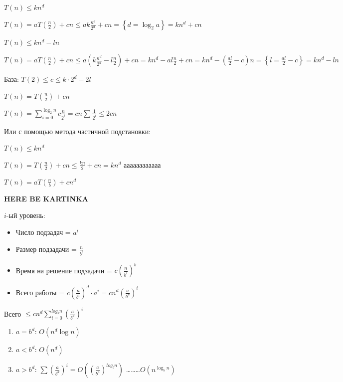 $T(n) \leqslant kn^d$

$T(n) = aT(\frac n2) + cn \leqslant ak \frac{n^d}{2^d}+cn = \left\{ d = \log_2a \right\} = kn^d + cn$

$T(n) \leqslant kn^d - ln$

$T(n) = aT(\frac n2) + cn \leqslant a\left(k \frac{n^d}{2^d}-l\frac n2\right)+cn = kn^d - al\frac n2 + cn = kn^d - \left( \frac{al}{2} - c \right)n = \left\{ l = \frac{al}{2} - c \right\} = kn^d - ln$

База: $T(2) \leqslant c \leqslant k\cdot 2^d - 2l$

$T(n) = T\left( \frac n2 \right) + cn$

$T(n) = \sum\limits_{i=0}^{\log_2n}c\frac{n}{2^i} = cn \sum\frac{1}{2^i} \leqslant 2cn$

Или с помощью метода частичной подстановки:

$T(n) \leqslant kn^d$

$T(n) = T\left( \frac n2 \right) + cn \leqslant \frac{kn}{2} + cn = kn^d$ аааааааааааа

\vspace{1cm}
$T(n) = aT\left( \frac nb \right) + cn^d$

\vspace{1.5cm}
\textbf{HERE BE KARTINKA}
\vspace{1.5cm}

$i$-ый уровень:
\begin{itemize}
    \item Число подзадач = $a^i$
    \item Размер подзадачи = $\frac{n}{b^i}$
    \item Время на решение подзадачи = $c\left( \frac{n}{b^i} \right)^b$
    \item Всего работы = $c\left(\frac{n}{b^i}\right)^d\cdot a^i = cn^d\left(\frac{a}{b^d}\right)^i$
\end{itemize}

Всего $\leqslant cn^d \sum\limits_{i=0}^{log_bn}\left( \frac{a}{b^d} \right)^i$
\begin{enumerate}
    \item $a = b^d$: $O(n^d\log n)$
    \item $a < b^d$: $O(n^d)$
    \item $a > b^d$: $\sum \left( \frac{a}{b^d} \right)^i = O\left( \left( \frac{a}{b^d} \right)^{log_bn} \right)$ \dots\dots\dots $O\left( n^{\log_bn} \right)$
\end{enumerate}

